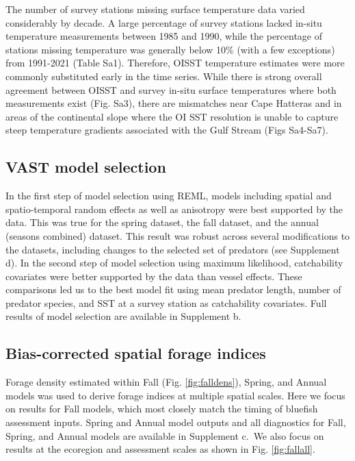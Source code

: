 \documentclass[
]{article}
\begin{document}
The number of survey stations missing surface temperature data varied considerably by decade. A large percentage of survey stations lacked in-situ temperature measurements between 1985 and 1990, while the percentage of stations missing temperature was generally below 10\% (with a few exceptions) from 1991-2021 (Table Sa1). Therefore, OISST temperature estimates were more commonly substituted early in the time series. While there is strong overall agreement between OISST and survey in-situ surface temperatures where both measurements exist (Fig. Sa3), there are mismatches near Cape Hatteras and in areas of the continental slope where the OI SST resolution is unable to capture steep temperature gradients associated with the Gulf Stream (Figs Sa4-Sa7).

\hypertarget{vast-model-selection}{%
\subsection{VAST model selection}\label{vast-model-selection}}

In the first step of model selection using REML, models including spatial and spatio-temporal random effects as well as anisotropy were best supported by the data. This was true for the spring dataset, the fall dataset, and the annual (seasons combined) dataset. This result was robust across several modifications to the datasets, including changes to the selected set of predators (see Supplement d). In the second step of model selection using maximum likelihood, catchability covariates were better supported by the data than vessel effects. These comparisons led us to the best model fit using mean predator length, number of predator species, and SST at a survey station as catchability covariates. Full results of model selection are available in Supplement b.

\hypertarget{bias-corrected-spatial-forage-indices}{%
\subsection{Bias-corrected spatial forage indices}\label{bias-corrected-spatial-forage-indices}}

Forage density estimated within Fall (Fig. \ref{fig:falldens}), Spring, and Annual models was used to derive forage indices at multiple spatial scales. Here we focus on results for Fall models, which most closely match the timing of bluefish assessment inputs. Spring and Annual model outputs and all diagnostics for Fall, Spring, and Annual models are available in Supplement c.~We also focus on results at the ecoregion and assessment scales as shown in Fig. \ref{fig:fallall}.
\end{document}
